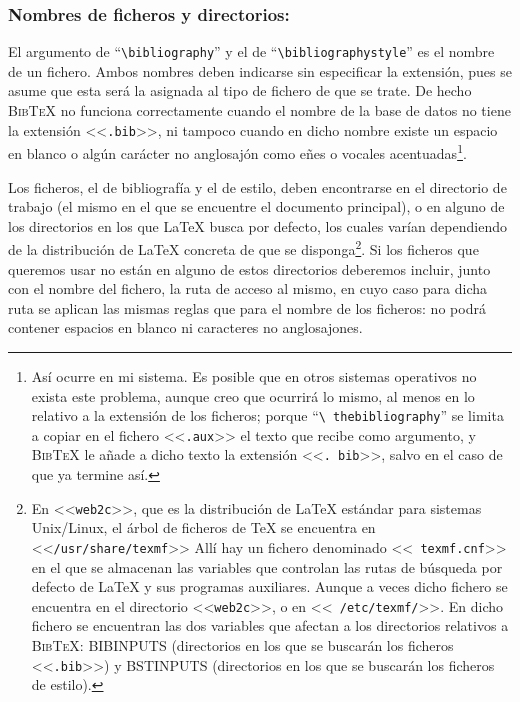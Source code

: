 \documentclass[a4paper,11pt]{article}
\def\btx-{\textsc{Bib\TeX}}
\def\ltx-{\LaTeX}
\def\ltr#1-{<<\texttt{#1}>>}
\def\tpf#1-{\ltr.#1-}
\def\cmd#1-{``\texttt{\textbackslash#1}''}
\begin{document}
\subsubsection*{Nombres de ficheros y directorios:}
\label{sec:nombres-de-ficheros}

El  argumento de  \cmd bibliography-  y el  de \cmd  bibliographystyle-  es el
nombre  de un  fichero.   Ambos  nombres deben  indicarse  sin especificar  la
extensión, pues se asume  que esta será la asignada al tipo  de fichero de que
se trate.   De hecho \btx-  no funciona correctamente  cuando el nombre  de la
base de  datos no  tiene la extensión  \tpf bib-,  ni tampoco cuando  en dicho
nombre existe un espacio en blanco  o algún carácter no anglosajón como eñes o
vocales acentuadas\footnote{Así ocurre en mi  sistema. Es posible que en otros
  sistemas operativos  no exista  este problema, aunque  creo que  ocurrirá lo
  mismo, al menos  en lo relativo a la extensión de  los ficheros; porque \cmd
  thebibliography- se  limita a copiar  en el fichero  \tpf aux- el  texto que
  recibe como  argumento, y  \btx- le  añade a dicho  texto la  extensión \tpf
  bib-, salvo en el caso de que ya termine así.}.

Los  ficheros, el  de bibliografía  y el  de estilo,  deben encontrarse  en el
directorio  de  trabajo  (el  mismo  en  el  que  se  encuentre  el  documento
principal), o en alguno de los directorios en los que \ltx- busca por defecto,
los cuales varían  dependiendo de la distribución de \ltx-  concreta de que se
disponga\footnote{\label{nota:cnf}En  \ltr web2c-, que  es la  distribución de
  \ltx- estándar para  sistemas Unix/Linux, el árbol de  ficheros de \TeX{} se
  encuentra  en \ltr  /usr/share/texmf- Allí  hay un  fichero  denominado \ltr
  texmf.cnf- en el  que se almacenan las variables que  controlan las rutas de
  búsqueda por  defecto de \ltx- y  sus programas auxiliares.   Aunque a veces
  dicho  fichero  se  encuentra  en  el  directorio \ltr  web2c-,  o  en  \ltr
  /etc/texmf/-.  En dicho fichero se  encuentran las dos variables que afectan
  a los  directorios relativos a \btx-:  BIBINPUTS (directorios en  los que se
  buscarán  los ficheros \tpf  bib-) y  BSTINPUTS (directorios  en los  que se
  buscarán los ficheros de estilo).  }.   Si los ficheros que queremos usar no
están en  alguno de estos directorios  deberemos incluir, junto  con el nombre
del fichero,  la ruta  de acceso  al mismo, en  cuyo caso  para dicha  ruta se
aplican  las mismas  reglas  que para  el  nombre de  los  ficheros: no  podrá
contener espacios en blanco ni caracteres no anglosajones.
\end{document}
